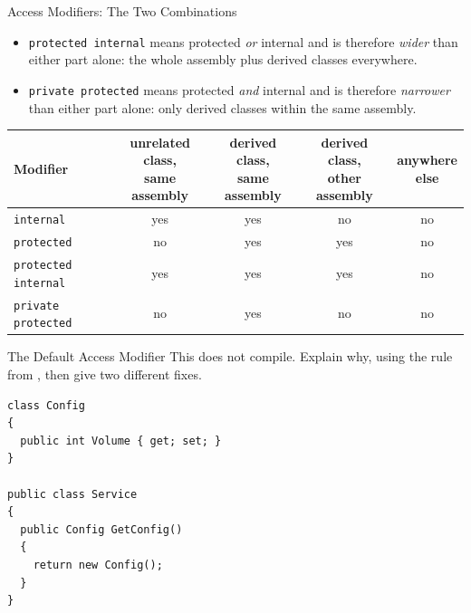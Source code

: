\begin{frame}{Access Modifiers: The Two Combinations}
  \begin{itemize}
    \item \texttt{protected internal} means protected \emph{or} internal and is
      therefore \emph{wider} than either part alone: the whole assembly plus
      derived classes everywhere.
    \item \texttt{private protected} means protected \emph{and} internal and is
      therefore \emph{narrower} than either part alone: only derived classes
      within the same assembly.
  \end{itemize}
  \vspace{1ex}

  \begin{center}
    \footnotesize
    \begin{tabular}{lcccc}
      \hline
      \textbf{Modifier}
        & \shortstack{unrelated class,\\same assembly}
        & \shortstack{derived class,\\same assembly}
        & \shortstack{derived class,\\other assembly}
        & \shortstack{anywhere\\else}\\
      \hline
      \texttt{internal}           & yes & yes & no  & no\\
      \texttt{protected}          & no  & yes & yes & no\\
      \texttt{protected internal} & yes & yes & yes & no\\
      \texttt{private protected}  & no  & yes & no  & no\\
      \hline
    \end{tabular}
  \end{center}
  \vspace{1ex}

\end{frame}

\begin{exerciseframe}{The Default Access Modifier}
  This does not compile. Explain why, using the rule from
  ,
  then give two different fixes.
  \vspace{1ex}

  \begin{lstlisting}[basicstyle=\scriptsize\ttfamily]
class Config
{
  public int Volume { get; set; }
}

public class Service
{
  public Config GetConfig()
  {
    return new Config();
  }
}
  \end{lstlisting}
\end{exerciseframe}

